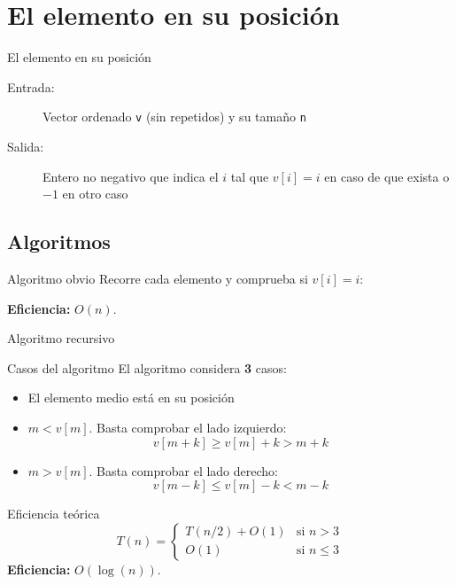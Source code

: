 \section{El elemento en su posición}

\begin{frame}{El elemento en su posición}
\begin{description}
 \item[Entrada:] Vector ordenado \texttt{v} (sin repetidos) y su tamaño \texttt{n}
 \item[Salida:] Entero no negativo que indica el $i$ tal que $v[i]=i$ en caso de que exista o $-1$ en otro caso
\end{description}
\end{frame}

\subsection{Algoritmos}

\begin{frame}[fragile]{Algoritmo obvio}
Recorre cada elemento y comprueba si $v[i] = i$:

\textbf{Eficiencia:} $O(n)$.
\end{frame}

\begin{frame}[fragile]{Algoritmo recursivo}

\end{frame}

\begin{frame}{Casos del algoritmo}
El algoritmo considera \textbf{3} casos:
\begin{itemize}
  \item El elemento medio está en su posición
  \item $m < v[m]$. Basta comprobar el lado izquierdo:
  \[v[m + k] \geq v[m]+k>m+k\]
  \item $m > v[m]$. Basta comprobar el lado derecho:
  \[v[m - k] \leq v[m] -k < m - k\]
\end{itemize}
\end{frame}

\begin{frame}{Eficiencia teórica}
\[T(n) = \begin{cases} T(n/2) + O(1) & \mbox{si } n > 3 \\
O(1) & \mbox{si } n \leq 3 \end{cases}\]
\textbf{Eficiencia:} $O(\log(n))$.
\end{frame}


